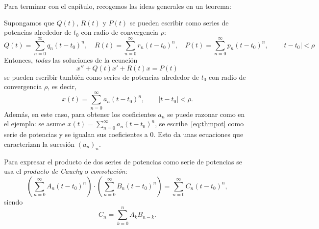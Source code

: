 \documentclass[../main.tex]{subfiles}
\begin{document}
Para terminar con el capítulo, recogemos las ideas generales en un teorema:
\begin{theorem}
  Supongamos que \(Q(t)\), \(R(t)\) y \(P(t)\) se pueden escribir como series
  de potencias alrededor de \(t_0\) con radio de convergencia \(\rho\):
  \[Q(t) = \sum_{n=0}^\infty q_n(t-t_0)^n, \quad R(t) = \sum_{n=0}^\infty
    r_n(t-t_0)^n, \quad P(t) = \sum_{n=0}^\infty p_n(t-t_0)^n, \qquad |t-t_0| <
    \rho\]
  Entonces, \emph{todas} las soluciones de la ecuación
  \begin{equation}
    \label{eq:thmpot}
    x'' + Q(t)x' + R(t)x = P(t)
  \end{equation}
  se pueden escribir también como series de potencias alrededor de
  \(t_0\) con radio de convergencia \(\rho\), es decir,
  \[x(t) = \sum_{n=0}^\infty a_n(t-t_0)^n, \qquad |t-t_0| < \rho.\]
  Además, en este caso, para obtener los coeficientes \(a_n\) se puede razonar
  como en el ejemplo: se asume \(x(t) = \sum_{n=0}^\infty a_n(t-t_0)^n\), se
  escribe~\eqref{eq:thmpot} como serie de potencias y se igualan sus
  coeficientes a 0. Esto da unas ecuaciones que caracterizan la sucesión
  \((a_n)_n\).
\end{theorem}

\begin{remark}
  Para expresar el producto de dos series de potencias como serie de potencias
  se usa el \emph{producto de Cauchy} o \emph{convolución}:
  \[\left( \sum_{n=0}^\infty A_n (t-t_0)^n \right) \cdot
    \left( \sum_{n=0}^\infty B_n (t-t_0)^n \right) =
    \sum_{n=0}^\infty C_n (t-t_0)^n,\]
  siendo
  \[C_n = \sum_{k=0}^n A_kB_{n-k}.\]
\end{remark}
\end{document}
